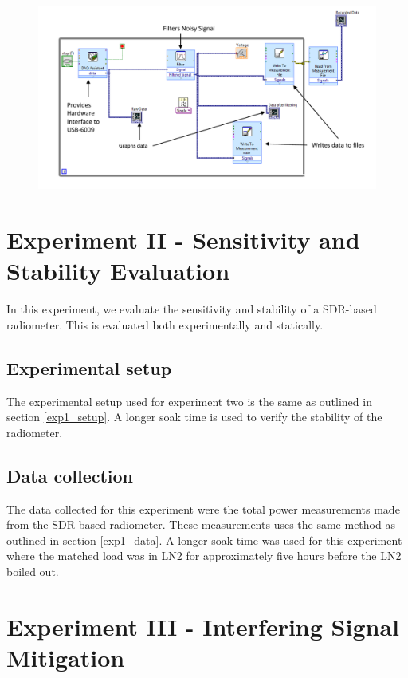 {\begin{figure}[h!tb] \centering
\includegraphics[width=\textwidth]{Images/labview_diagram.pdf}
\label{labviewblock}
\end{figure}
}

\section{Experiment II - Sensitivity and Stability Evaluation}\label{Exp2}

In this experiment, we evaluate the sensitivity and stability of a SDR-based radiometer.  This is evaluated both experimentally and statically.  

\subsection{Experimental setup} \label{exp2_setup}
The experimental setup used for experiment two is the same as outlined in section \ref{exp1_setup}.  A longer soak time is used to verify the stability of the radiometer.

\subsection{Data collection}
The data collected for this experiment were the total power measurements made from the SDR-based radiometer.  These measurements uses the same method as outlined in section \ref{exp1_data}.  A longer soak time was used for this experiment where the matched load was in LN2 for approximately five hours before the LN2 boiled out.  

\section{Experiment III - Interfering Signal Mitigation}\label{Exp3}

